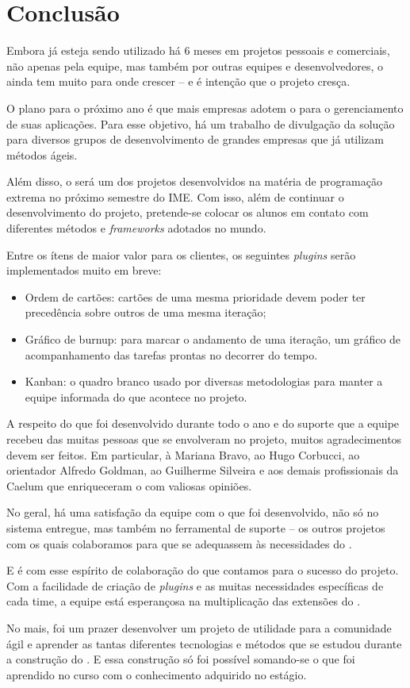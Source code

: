 \section{Conclusão}

Embora já esteja sendo utilizado há 6 meses em projetos pessoais e comerciais, não apenas pela equipe, mas também por outras equipes e desenvolvedores, o \calopsita{} ainda tem muito para onde crescer -- e é intenção que o projeto cresça.

O plano para o próximo ano é que mais empresas adotem o \calopsita{} para o gerenciamento de suas aplicações. Para esse objetivo, há um trabalho de divulgação da solução para diversos grupos de desenvolvimento de grandes empresas que já utilizam métodos ágeis.

Além disso, o \calopsita{} será um dos projetos desenvolvidos na matéria de programação extrema no próximo semestre do IME. Com isso, além de continuar o desenvolvimento do projeto, pretende-se colocar os alunos em contato com diferentes métodos e \textit{frameworks} adotados no mundo.

Entre os ítens de maior valor para os clientes, os seguintes \textit{plugins} serão implementados muito em breve:

\begin{itemize}
	\item{Ordem de cartões: cartões de uma mesma prioridade devem poder ter precedência sobre outros de uma mesma iteração;}
	\item{Gráfico de burnup: para marcar o andamento de uma iteração, um gráfico de acompanhamento das tarefas prontas no decorrer do tempo.}
	\item{Kanban: o quadro branco usado por diversas metodologias para manter a equipe informada do que acontece no projeto.}
\end{itemize}

A respeito do que foi desenvolvido durante todo o ano e do suporte que a equipe recebeu das muitas pessoas que se envolveram no projeto, muitos agradecimentos devem ser feitos. Em particular, à Mariana Bravo, ao Hugo Corbucci, ao orientador Alfredo Goldman, ao Guilherme Silveira e aos demais profissionais da Caelum que enriqueceram o \calopsita{} com valiosas opiniões. 

No geral, há uma satisfação da equipe com o que foi desenvolvido, não só no sistema entregue, mas também no ferramental de suporte -- os outros projetos \opensource com os quais colaboramos para que se adequassem às necessidades do \calopsita{}.

E é com esse espírito de colaboração do \opensource que contamos para o sucesso do projeto. Com a facilidade de criação de \textit{plugins} e as muitas necessidades específicas de cada time, a equipe está esperançosa na multiplicação das extensões do \calopsita{}.

No mais, foi um prazer desenvolver um projeto de utilidade para a comunidade ágil e aprender as tantas diferentes tecnologias e métodos que se estudou durante a construção do \calopsita{}. E essa construção só foi possível somando-se o que foi aprendido no curso com o conhecimento adquirido no estágio.

